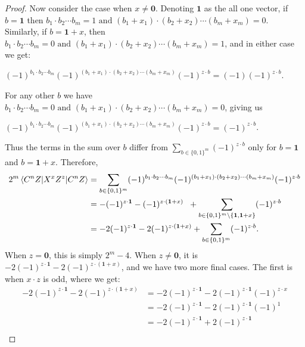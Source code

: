 \documentclass[12pt]{dalthesis}
\begin{document}
\begin{proof}
Now consider the case when $x \neq \textbf{0}$. Denoting $\textbf{1}$ as the all one vector, if $b = \textbf{1}$ then $b_1 \cdot b_2 \cdots b_m = 1 \mbox{ and } (b_1 + x_1) \cdot (b_2 + x_2) \cdots (b_m + x_m) = 0$. Similarly, if $b = \textbf{1} + x$, then $b_1 \cdot b_2 \cdots b_m = 0 \mbox{ and } (b_1 + x_1) \cdot (b_2 + x_2) \cdots (b_m + x_m) = 1$, and in either case we get: 
\begin{center}
$ (-1)^{b_1 \cdot b_2 \cdots b_m} (-1)^{(b_1 + x_1) \cdot (b_2 + x_2) \cdots (b_m + x_m)} (-1)^{z \cdot b} = (-1) (-1)^{z \cdot b}$.
\end{center}
For any other $b$ we have $b_1 \cdot b_2 \cdots b_m = 0 \mbox{ and } (b_1 + x_1) \cdot (b_2 + x_2) \cdots (b_m + x_m) = 0$, giving us 
\begin{center}
$ (-1)^{b_1 \cdot b_2 \cdots b_m} (-1)^{(b_1 + x_1) \cdot (b_2 + x_2) \cdots (b_m + x_m)} (-1)^{z \cdot b} = (-1)^{z \cdot b}$.
\end{center}
Thus the terms in the sum over $b$ differ from $\sum_{b \in \{0, 1\}^m} (-1)^{z \cdot b}$ only for $b = \textbf{1}$ and $b = \textbf{1} + x$. Therefore, 
\begin{equation*}
\begin{split}
2^m\braket{C^n Z|X^xZ^z|C^n Z} & = \sum\limits_{b \in \{0, 1\}^m} (-1)^{b_1 \cdot b_2 \cdots b_m} (-1)^{(b_1 + x_1) \cdot (b_2 + x_2) \cdots (b_m + x_m)} (-1)^{z \cdot b} \\
& = - (-1)^{z \cdot \textbf{1}} - (-1)^{z \cdot (\textbf{1} + x)} \hspace{2mm} + \sum\limits_{b \in \{0, 1\}^m \setminus \{\textbf{1}, \textbf{1} + x \} } (-1)^{z \cdot b}  \\
& = -2(-1)^{z \cdot \textbf{1}} - 2(-1)^{z \cdot (\textbf{1} + x)} + \sum\limits_{b \in \{0, 1\}^m} (-1)^{z \cdot b}.
\end{split}
\end{equation*}
When $z = \textbf{0}$, this is simply $2^m - 4$. When $z \neq \textbf{0}$, it is $-2(-1)^{z \cdot \textbf{1}} - 2(-1)^{z \cdot (\textbf{1} + x)}$, and we have two more final cases. The first is when $x \cdot z$ is odd, where we get:
\begin{equation*}
\begin{split}
-2(-1)^{z \cdot \textbf{1}} - 2(-1)^{z \cdot (\textbf{1} + x)} & = -2(-1)^{z \cdot \textbf{1}} - 2(-1)^{z \cdot \textbf{1}} (-1)^{z \cdot x} \\
& = -2(-1)^{z \cdot \textbf{1}} - 2(-1)^{z \cdot \textbf{1}} (-1)^1 \\
& = -2(-1)^{z \cdot \textbf{1}} + 2(-1)^{z \cdot \textbf{1}} \\

\end{split}
\end{equation*}
\end{proof}
\end{document}
